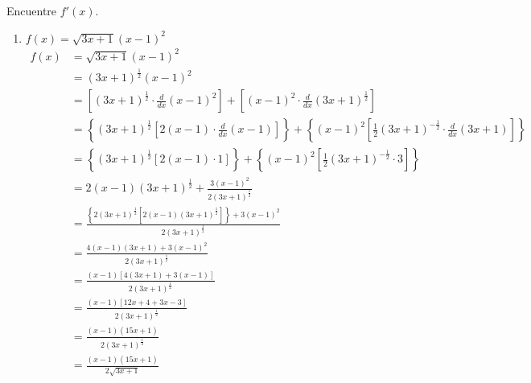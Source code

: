\documentclass[12pt]{article}
\begin{document}
Encuentre $f'(x)$.
\begin{enumerate}[label=(\alph*)]
\item $f(x)=\sqrt{3x+1} (x-1)^2$
  \begin{equation*}
    \begin{split}
      f(x)
      &=\sqrt{3x+1} (x-1)^2\\
      &= (3x+1)^{\frac{1}{2}}(x-1)^2\\
      &= \left[ (3x+1)^{\frac{1}{2}} \cdot \frac{d}{dx}(x-1)^2 \right]
         + \left[ (x-1)^2 \cdot \frac{d}{dx}(3x+1)^{\frac{1}{2}} \right]\\
      &= \left\lbrace (3x+1)^{\frac{1}{2}} \left[ 2(x-1)\cdot \frac{d}{dx}(x-1)\right] \right\rbrace
         + \left\lbrace (x-1)^2\left[\frac{1}{2}(3x+1)^{-\frac{1}{2}}\cdot \frac{d}{dx}(3x+1)\right] \right\rbrace\\
      &= \left\lbrace (3x+1)^{\frac{1}{2}} \left[ 2(x-1)\cdot 1\right] \right\rbrace
         + \left\lbrace (x-1)^2\left[\frac{1}{2}(3x+1)^{-\frac{1}{2}}\cdot 3\right] \right\rbrace\\
         &= 2(x-1)(3x+1)^{\frac{1}{2}} + \frac{3(x-1)^2}{2(3x+1)^{\frac{1}{2}}}\\
         &= \frac{\left\lbrace2(3x+1)^{\frac{1}{2}}\left[2(x-1)(3x+1)^{\frac{1}{2}}\right]\right\rbrace
           + 3(x-1)^2}{2(3x+1)^{\frac{1}{2}}}\\
         &= \frac{4(x-1)(3x+1) + 3(x-1)^2}{2(3x+1)^{\frac{1}{2}}}\\
         &= \frac{(x-1)\left[ 4(3x+1)+3(x-1)  \right]}{2(3x+1)^{\frac{1}{2}}}\\
         &= \frac{(x-1)\left[ 12x+4+3x-3  \right]}{2(3x+1)^{\frac{1}{2}}}\\
         &= \frac{(x-1)(15x+1)}{2(3x+1)^{\frac{1}{2}}}\\
         &= \frac{(x-1)(15x+1)}{2\sqrt{3x+1}}\\
    \end{split}
  \end{equation*}
  

\end{enumerate}
\end{document}
